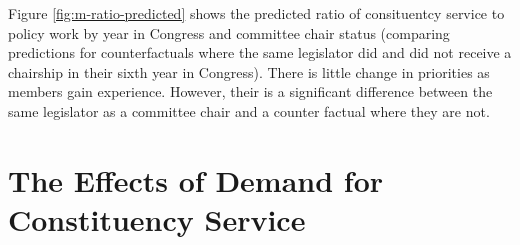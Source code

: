 \documentclass[12pt]{article}
\begin{document}
Figure \ref{fig:m-ratio-predicted} shows the predicted ratio of consituentcy service to policy work by year in Congress and committee chair status (comparing predictions for counterfactuals where the same legislator did and did not receive a chairship in their sixth year in Congress). There is little change in priorities as members gain experience. However, their is a significant difference between the same legislator as a committee chair and a counter factual where they are not.










\section{The Effects of Demand for Constituency Service}\label{s:demand} 
\end{document}
